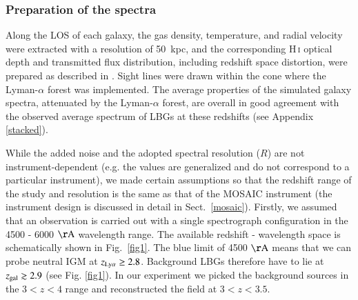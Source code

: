 \documentclass{aa}
\begin{document}
\subsubsection{Preparation of the spectra}
Along the LOS of each galaxy, the gas density, temperature, and radial velocity were extracted with a resolution of 50~kpc, and the corresponding H\,\textsc{i} optical depth and  transmitted flux distribution, including redshift space distortion, were prepared as described in \cite{laigle19}. Sight lines were drawn within the cone where the Lyman-$\alpha$ forest was implemented. The average properties of the simulated galaxy spectra, attenuated by the Lyman-$\alpha$ forest, are overall in good agreement with the observed average spectrum of LBGs at these redshifts (see Appendix \ref{stacked}).

While the added noise and the adopted spectral resolution ($R$) are not instrument-dependent (e.g. the values are generalized and do not correspond to a particular instrument), we made certain assumptions so that the redshift range of the study and resolution is the same as that of the MOSAIC instrument (the instrument design is discussed in detail in Sect.~\ref{mosaic}). Firstly, we assumed that an observation is carried out with a single spectrograph configuration in the 4500 - 6000 $\mathrm{\AA}$ wavelength range. The available redshift - wavelength space is schematically shown in Fig.~\ref{fig1}. The blue limit of 4500 $\mathrm{\AA}$ means that we can probe neutral IGM at $z_{\rm Ly\alpha} \geq 2.8$. Background LBGs therefore have to lie at $z_{\rm gal} \gtrsim 2.9$ (see Fig. \ref{fig1}). In our experiment we picked the background sources in the $3 < z < 4$ range and reconstructed the field at $3 < z < 3.5$.
\end{document}
